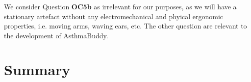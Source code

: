 We consider Question \textbf{OC5b} as irrelevant for our purposes, as we will have a stationary artefact without any electromechanical and phyical ergonomic properties, i.e. moving arms, waving ears, etc. The other question are relevant to the development of AsthmaBuddy.

\newpage




\section{Summary}